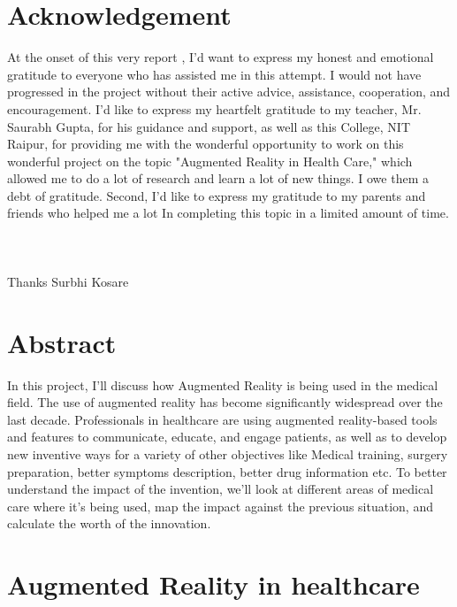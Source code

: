 \documentclass[12pt]{article}
\begin{document}
\section{Acknowledgement}
At the onset of this very report , I'd want to express my honest and emotional gratitude to everyone who has assisted me in this attempt. I would not have progressed in the project without their active advice, assistance, cooperation, and encouragement.
                                                                 I'd like to express my heartfelt gratitude to my teacher, Mr. Saurabh Gupta, for his guidance and support, as well as this College, NIT Raipur, for providing me with the wonderful opportunity to work on this wonderful project on the topic "Augmented Reality in Health Care," which allowed me to do a lot of research and learn a lot of new things.
I owe them a debt of gratitude.
Second, I'd like to express my gratitude to my parents and friends who helped me a lot In completing this topic in a limited amount of time.

\paragraph{~}
Thanks
\linebreak
Surbhi Kosare
\pagebreak
\section{Abstract}
In this project, I'll discuss how Augmented Reality is being used in the medical field. The use of augmented reality has become significantly widespread  over the last decade. Professionals in healthcare are using augmented reality-based tools and features to communicate, educate, and engage patients, as well as to develop new inventive ways for a variety of other objectives like Medical training, surgery preparation, better symptoms description, better drug information etc. To better understand the impact of the invention, we'll look at different areas of medical care where it's being used, map the impact against the previous situation, and calculate the worth of the innovation.
\pagebreak
\section{Augmented Reality in healthcare}
\end{document}
